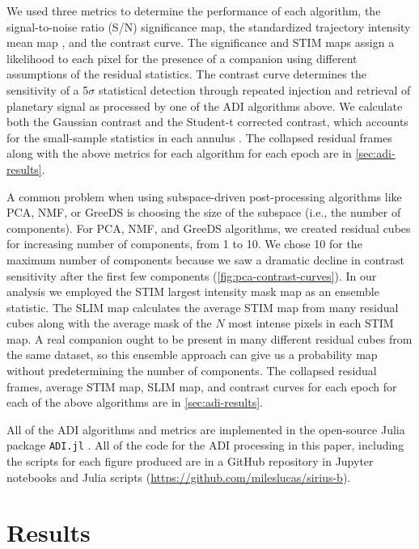 \documentclass[twocolumn]{aastex631}
\begin{document}
We used three metrics to determine the performance of each algorithm, the signal-to-noise ratio (S/N) significance map, the standardized trajectory intensity mean map \citep[STIM map;][]{pairet_stim_2019}, and the contrast curve. The significance and STIM maps assign a likelihood to each pixel for the presence of a companion using different assumptions of the residual statistics. The contrast curve determines the sensitivity of a 5$\sigma$ statistical detection through repeated injection and retrieval of planetary signal as processed by one of the ADI algorithms above. We calculate both the Gaussian contrast and the Student-t corrected contrast, which accounts for the small-sample statistics in each annulus \citep{mawet_fundamental_2014}. The collapsed residual frames along with the above metrics for each algorithm for each epoch are in \cref{sec:adi-results}.

A common problem when using subspace-driven post-processing algorithms like PCA, NMF, or GreeDS is choosing the size of the subspace (i.e., the number of components). For PCA, NMF, and GreeDS algorithms, we created residual cubes for increasing number of components, from 1 to 10. We chose 10 for the maximum number of components because we saw a dramatic decline in contrast sensitivity after the first few components (\cref{fig:pca-contrast-curves}). In our analysis we employed the STIM largest intensity mask map \citep[SLIM map;][]{pairet_signal_2020} as an ensemble statistic. The SLIM map calculates the average STIM map from many residual cubes along with the average mask of the $N$ most intense pixels in each STIM map. A real companion ought to be present in many different residual cubes from the same dataset, so this ensemble approach can give us a probability map without predetermining the number of components. The collapsed residual frames, average STIM map, SLIM map, and contrast curves for each epoch for each of the above algorithms are in \cref{sec:adi-results}.

All of the ADI algorithms and metrics are implemented in the open-source Julia package \texttt{ADI.jl} \citep{lucas_adijl_2020}. All of the code for the ADI processing in this paper, including the scripts for each figure produced are in a GitHub repository in Jupyter notebooks and Julia scripts (\href{https://github.com/mileslucas/sirius-b}{https://github.com/mileslucas/sirius-b}).

\section{Results} \label{sec:results}
\end{document}
